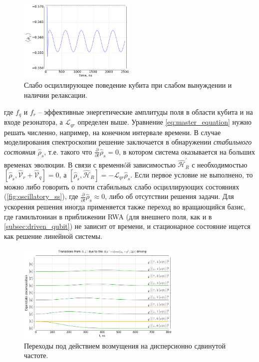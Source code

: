 \documentclass[12pt, twoside]{report}
\numberwithin{equation}{section}
\numberwithin{figure}{section}
\begin{document}
\begin{figure}
\includegraphics[width=0.5\textwidth]{Pictures/oscillatory_quasisteadystate}
\caption{Слабо осциллирующее поведение кубита при слабом вынуждении и наличии релаксации.}
\label{fig:oscillatory_ss}
\end{figure}

\hspace{-\parindent}где $f_q$ и $f_r$ -- эффективные энергетические амплитуды поля в области кубита и на входе резонатора, а $\mathcal{L}_{qr}$ определен выше. Уравнение \eqref{eq:master_equation} нужно решать численно, например, на конечном интервале времени. В случае моделирования спектроскопии решение заключается в обнаружении \textit{стабильного состояния} $\hat \rho_s$, т.е. такого что $\frac{\partial }{\partial t}\hat \rho_s = 0$, в котором система оказывается на больших временах эволюции. В связи с временнóй зависимостью $\mathcal{\hat H}_R^{\prime}$ с необходимостью $[\hat \rho_s, \mathcal{\hat V}_r + \mathcal{\hat V}_q] = 0$, а $[\hat \rho_s, \mathcal{\hat H}_R] = - \mathcal{L}_{qr}\hat\rho_s$. 
Если первое условие не выполнено, то можно либо говорить о почти стабильных слабо осциллирующих состояниях (\autoref{fig:oscillatory_ss}), где $\frac{\partial }{\partial t}\hat \rho_s \approx 0$, либо об отсутствии решения задачи. Для ускорения решения иногда применяется также переход во вращающийся базис\cite{Bishop2010}, где гамильтониан в приближении RWA (для внешнего поля, как и в \autoref{subsec:driven_qubit}) не зависит от времени, и стационарное состояние ищется как решение линейной системы.

\begin{figure}[h!]
\centering
\includegraphics[width=0.7\textwidth]{Pictures/climbing}
\caption{Переходы под действием возмущения на дисперсионно сдвинутой частоте.}
\end{figure}
\end{document}
